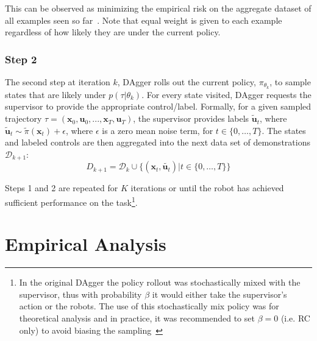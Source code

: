 \documentclass[10pt, conference]{ieeeconf}      %
\newcommand{\bu}{\mathbf{u}}
\newcommand{\bx}{\mathbf{x}}
\begin{document}
\noindent This can be observed as minimizing the empirical risk on the aggregate dataset of all examples seen so far~\cite{scholkopf2002learning}.  Note that equal weight is given to each example regardless of how likely they are under the current policy.
 

 \subsubsection{Step 2}
The second step at iteration $k$, DAgger rolls out the current policy, $\pi_{\theta_{k}}$, to sample states that are likely under $p(\tau|\theta_{k})$.  For every state visited, DAgger requests the supervisor to provide the appropriate control/label. Formally, for a given sampled trajectory  $\tau = (\bx_0,\bu_0,...,\bx_T,\bu_T )$, the supervisor provides labels $\tilde{\bu}_t$, where $\tilde{\bu}_t \sim \tilde{\pi}(\bx_t) + \epsilon$, where $\epsilon$ is a  zero mean noise term, for $t\in \{0, \ldots, T\}$.
The states and labeled controls are then aggregated into the next data set of demonstrations $\mathcal{D}_{k+1}$:
$$D_{k+1}=\mathcal{D}_k \cup \{(\bx_t,\tilde{\bu_t})|t\in\{0,\ldots,T\}\} $$

\noindent Steps 1 and 2 are repeated for $K$ iterations or until the robot has achieved sufficient performance on the
task\footnote{In the original DAgger the policy rollout was stochastically mixed with the supervisor, thus with
    probability $\beta$ it would either take the supervisor's action or the robots. The use of this stochastically mix
    policy was for theoretical analysis and in practice, it was recommended to set $\beta = 0$ (i.e. RC only) to avoid biasing the
sampling~\cite{NIPS2014_5421,ross2010reduction}}.


 


\section{Empirical Analysis}
\end{document}
